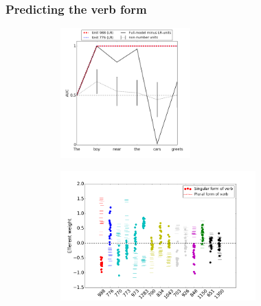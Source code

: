 \subsubsection{Predicting the verb form}\label{subsec:output-weight}
\begin{figure}[t]
    \centering
    \begin{subfigure}{0.49\textwidth}
            \centering
            \includegraphics[height=5cm]{Figures/GAT1d_cell_nounpp_SR_LR_single_unit.png}
            \label{fig:GAT}
    \end{subfigure}
    \begin{subfigure}{0.49\textwidth}
            \centering
            \includegraphics[height=5cm]{Figures/Figure5_output_weights.png}
            \label{fig:output-weights}
    \end{subfigure}
    
\end{figure}

